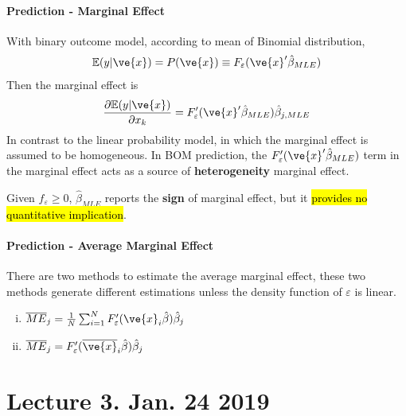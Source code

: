 \documentclass[11pt]{article}
\begin{document}
				\paragraph{Prediction - Marginal Effect} With binary outcome model, according to mean of Binomial distribution, 
					\begin{gather}
						\expect{y|\ve{x}} = P(\ve{x}) \equiv F_\varepsilon(\ve{x}' \hat{\beta}_{MLE})
					\end{gather}
					Then the marginal effect is
					\begin{gather}
						\pd{\expect{y|\ve{x}}}{x_k} = F'_\varepsilon(\ve{x}' \hat{\beta}_{MLE}) \hat{\beta}_{j, MLE}
					\end{gather}
					In contrast to the linear probability model, in which the marginal effect is assumed to be homogeneous. In BOM prediction, the $F'_\varepsilon(\ve{x}' \hat{\beta}_{MLE})$ term in the marginal effect acts as a source of \textbf{heterogeneity} marginal effect.
				
				\begin{remark}
					Given $f_\varepsilon \geq 0$, $\hat{\beta}_{MLE}$ reports the \textbf{sign} of marginal effect, but it \hl{provides no quantitative implication}.
				\end{remark}
				
				\paragraph{Prediction - Average Marginal Effect}
					There are two methods to estimate the average marginal effect, these two methods generate different estimations unless the density function of $\varepsilon$ is linear.
					\begin{enumerate}[(i)]
						\item $\overline{ME}_j = \frac{1}{N} \sum_{i=1}^N F'_\varepsilon(\ve{x}_i \hat{\beta}) \hat{\beta}_j$
						\item $\overline{ME}_j = F'_\varepsilon(\overline{\ve{x}}_i \hat{\beta}) \hat{\beta}_j$
					\end{enumerate}
			
	\section{Lecture 3. Jan. 24 2019}
\end{document}
